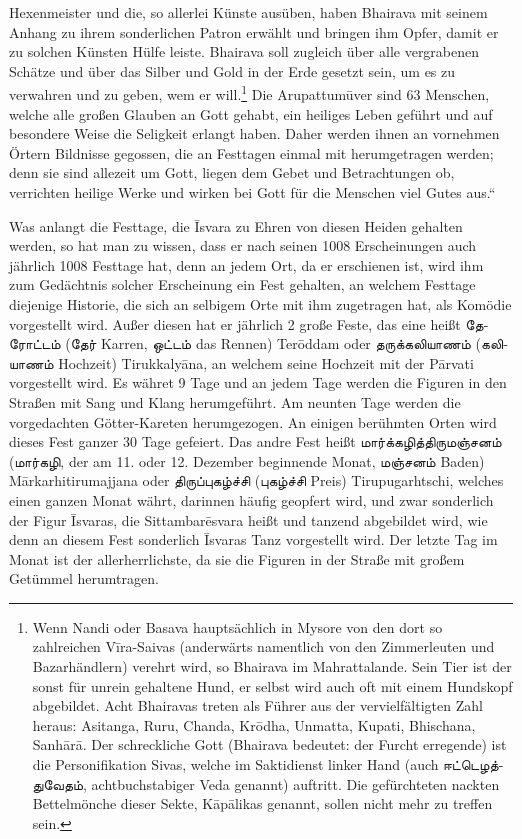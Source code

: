 \documentclass{article}
\newcommand{\TamilText}[1]{\texttamil{#1}}
\newcommand{\tam}[1]{\TamilText{#1}}
\begin{document}
Hexenmeister und die, so allerlei Künste ausüben, haben Bhairava mit seinem Anhang zu ihrem sonderlichen Patron erwählt und bringen ihm Opfer, damit er zu solchen Künsten Hülfe leiste. Bhairava soll zugleich über alle vergrabenen Schätze und über das Silber und Gold in der Erde gesetzt sein, um es zu verwahren und zu geben, wem er will.\footnote{Wenn Nandi oder Basava hauptsächlich in Mysore von den dort so zahlreichen V\={i}ra-Saivas (anderwärts namentlich von den Zimmerleuten und Bazarhändlern) verehrt wird, so Bhairava im Mahrattalande. Sein Tier ist der sonst für unrein gehaltene Hund, er selbst wird auch oft mit einem Hundskopf abgebildet. Acht Bhairavas treten als Führer aus der vervielfältigten Zahl heraus: Asitanga, Ruru, Chanda, Kr\={o}dha, Unmatta, Kupati, Bhischana, Sanh\={a}r\={a}. Der schreckliche Gott (Bhairava bedeutet: der Furcht erregende) ist die Personifikation Sivas, welche im Saktidienst linker Hand (auch \tam{ஈட்டெழத்துவேதம்}, achtbuchstabiger Veda genannt) auftritt. Die gefürchteten nackten Bettelmönche dieser Sekte, K\={a}p\={a}likas genannt, sollen nicht mehr zu treffen sein.} Die Arupattum\={u}ver sind 63 Menschen, welche alle großen Glauben an Gott gehabt, ein heiliges Leben geführt und auf besondere Weise die Seligkeit erlangt haben. Daher werden ihnen an vornehmen Örtern Bildnisse gegossen, die an Festtagen einmal mit herumgetragen werden; denn sie sind allezeit um Gott, liegen dem Gebet und Betrachtungen ob, verrichten heilige Werke und wirken bei Gott für die Menschen viel Gutes aus.“

Was anlangt die Festtage, die \={I}svara zu Ehren von diesen Heiden gehalten werden, so hat man zu wissen, dass er nach seinen 1008 Erscheinungen auch jährlich 1008 Festtage hat, denn an jedem Ort, da er erschienen ist, wird ihm zum Gedächtnis solcher Erscheinung ein Fest gehalten, an welchem Festtage diejenige Historie, die sich an selbigem Orte mit ihm zugetragen hat, als Komödie vorgestellt wird. Außer diesen hat er jährlich 2 große Feste, das eine heißt \tam{தேரோட்டம்} (\tam{தேர்} Karren, \tam{ஒட்டம்} das Rennen) Ter\={o}ddam oder \tam{தருக்கலியாணம்} (\tam{கலியாணம்} Hochzeit) Tirukkaly\={a}na, an welchem seine Hochzeit mit der P\={a}rvati vorgestellt wird. Es währet 9 Tage und an jedem Tage werden die Figuren in den Straßen mit Sang und Klang herumgeführt. Am neunten Tage werden die vorgedachten Götter-Kareten herumgezogen. An einigen berühmten Orten wird dieses Fest ganzer 30 Tage gefeiert. Das andre Fest heißt \tam{மார்க்கழித்திருமஞ்சனம்} (\tam{மார்கழி}, der am 11. oder 12. Dezember beginnende Monat, \tam{மஞ்சனம்} Baden) M\={a}rkarhitirumajjana oder \tam{திருப்புகழ்ச்சி} (\tam{புகழ்ச்சி} Preis) Tirupugarhtschi, welches einen ganzen Monat währt, darinnen häufig geopfert wird, und zwar sonderlich der Figur \={I}svaras, die Sittambar\={e}svara heißt und tanzend abgebildet wird, wie denn an diesem Fest sonderlich \={I}svaras Tanz vorgestellt wird. Der letzte Tag im Monat ist der allerherrlichste, da sie die Figuren in der Straße mit großem Getümmel herumtragen.
\end{document}
